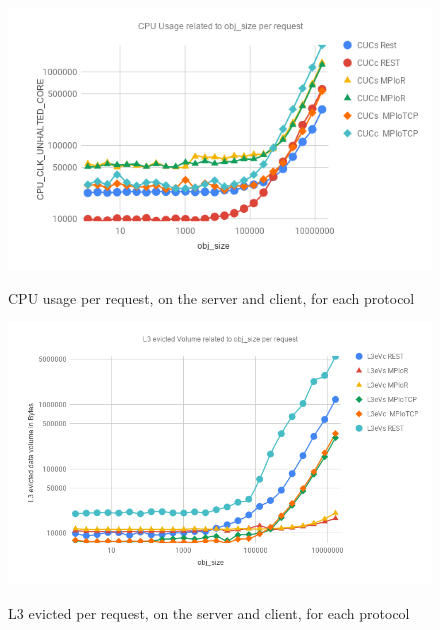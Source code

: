 \documentclass[runningheads]{llncs}
\begin{document}
\begin{figure}
    \centering
    \begin{minipage}{0.49\textwidth}
        \centering\vspace{-2em}
        \includegraphics[width=1\textwidth]{cpu-usage-rest-mpi.png}\vspace{-1em}
        \caption{CPU usage per request, on the server and client, for each protocol}\vspace{-1.5em}
		\label{fig:cpu-usage-rest-mpi}
    \end{minipage}\hfill
    \begin{minipage}{0.49\textwidth}
        \centering\vspace{-2em}
        \includegraphics[width=1\textwidth]{l3ev-rest-mpi.png}\vspace{-1em}
        \caption{L3 evicted per request, on the server and client, for each protocol}\vspace{-1.5em}
		\label{fig:l3ev-rest-mpi}
    \end{minipage}
\end{figure}
\vspace{-1.5em}
\end{document}
